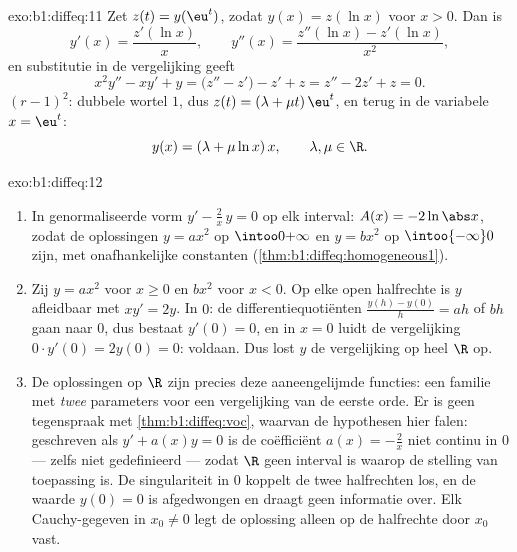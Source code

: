 \begin{solution}{exo:b1:diffeq:11}
Zet $z(t) = y(\eu^t)$, zodat $y(x) = z(\ln x)$ voor $x > 0$. Dan is
\[
y'(x) = \frac{z'(\ln x)}x,
\qquad
y''(x) = \frac{z''(\ln x) - z'(\ln x)}{x^2} ,
\]
en substitutie in de vergelijking geeft
\[
x^2y'' - xy' + y = \bigl(z'' - z'\bigr) - z' + z
= z'' - 2z' + z = 0 .
\]
 $(r - 1)^2$: dubbele wortel $1$, dus $z(t) =
(\lambda + \mu t)\,\eu^t$, en terug in de variabele $x = \eu^t$:
\[
y(x) = (\lambda + \mu\ln x)\,x,
\qquad \lambda, \mu \in \R .
\]
\end{solution}

\begin{solution}{exo:b1:diffeq:12}
\begin{enumerate}
  \item In genormaliseerde vorm $y' - \frac2x\,y = 0$ op elk interval:
        $A(x) = -2\ln\abs x$, zodat de oplossingen $y = a x^2$ op
        $\intoo0{+\infty}$ en $y = b x^2$ op $\intoo{-\infty}0$ zijn,
        met onafhankelijke constanten
        (\cref{thm:b1:diffeq:homogeneous1}).
  \item Zij $y = ax^2$ voor $x \geq 0$ en $bx^2$ voor $x < 0$. Op elke
        open halfrechte is $y$ afleidbaar met $xy' = 2y$. In $0$: de
        differentiequotiënten $\frac{y(h) - y(0)}h = ah$ of $bh$ gaan
        naar $0$, dus bestaat $y'(0) = 0$, en in $x = 0$ luidt de
        vergelijking $0 \cdot y'(0) = 2y(0) = 0$: voldaan. Dus lost $y$
        de vergelijking op heel $\R$ op.
  \item De oplossingen op $\R$ zijn precies deze aaneengelijmde
        functies: een familie met \emph{twee} parameters voor een
        vergelijking van de eerste orde. Er is geen tegenspraak met
        \cref{thm:b1:diffeq:voc}, waarvan de hypothesen hier falen:
        geschreven als $y' + a(x)y = 0$ is de coëfficiënt $a(x) =
        -\frac2x$ niet continu in $0$ --- zelfs niet gedefinieerd ---
        zodat $\R$ geen interval is waarop de stelling van toepassing
        is. De singulariteit in $0$ koppelt de twee halfrechten los, en
        de waarde $y(0) = 0$ is afgedwongen en draagt geen informatie
        over. Elk Cauchy-gegeven in $x_0 \neq 0$ legt de oplossing
        alleen op de halfrechte door $x_0$ vast.
\end{enumerate}
\end{solution}

